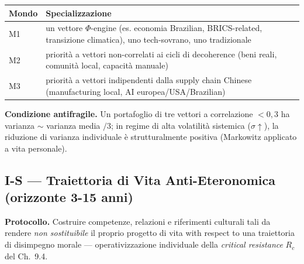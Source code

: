 {\def\LTcaptype{none} %
{\small\begin{longtable}[]{@{}
  >{\raggedright\arraybackslash}p{}
  >{\raggedright\arraybackslash}p{}@{}}
\toprule\noalign{}
\begin{minipage}[b]{\linewidth}\raggedright
Mondo
\end{minipage} & \begin{minipage}[b]{\linewidth}\raggedright
Specializzazione
\end{minipage} \\
\midrule\noalign{}
\endhead
\bottomrule\noalign{}
\endlastfoot
M1 & un vettore \(\Phi\)-engine (es. economia Brazilian, BRICS-related,
transizione climatica), uno tech-sovrano, uno tradizionale \\
M2 & priorità a vettori non-correlati ai cicli di decoherence (beni
reali, comunità local, capacità manuale) \\
M3 & priorità a vettori indipendenti dalla supply chain Chinese
(manufacturing local, AI europea/USA/Brazilian) \\
\end{longtable}}
}

\Proved{} \textbf{Condizione antifragile.} Un portafoglio di tre vettori
a correlazione \(< 0{,}3\) ha varianza \(\sim\) varianza media \(/ 3\);
in regime di alta volatilità sistemica (\(\sigma \uparrow\)), la
riduzione di varianza individuale è strutturalmente positiva (Markowitz
applicato a vita personale).

\subsection{I-S --- Traiettoria di Vita Anti-Eteronomica (orizzonte 3-15
anni)}\label{i-s-traiettoria-di-vita-anti-eteronomica-orizzonte-3-15-anni}

\Hypoth{} \textbf{Protocollo.} Costruire competenze, relazioni e
riferimenti culturali tali da rendere \emph{non sostituibile} il proprio
progetto di vita with respect to una traiettoria di disimpegno morale ---
operativizzazione individuale della \emph{critical resistance} \(R_c\)
del Ch.~9.4.


